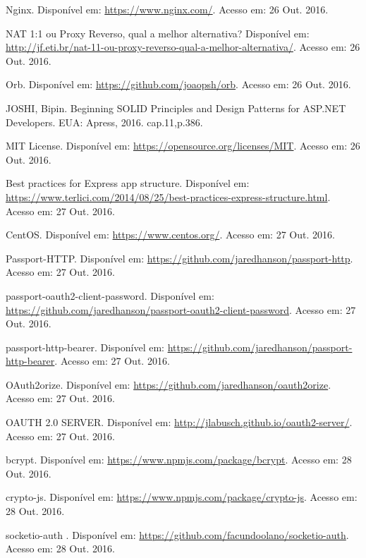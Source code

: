 \documentclass[brazil,ruledheader]{abntifes}
\begin{document}
\begin{thebibliography}{9}
		Nginx. Disponível em: \url{https://www.nginx.com/}.
		Acesso em: 26 Out. 2016.
		
		NAT 1:1 ou Proxy Reverso, qual a melhor alternativa? Disponível em: \url{http://jf.eti.br/nat-11-ou-proxy-reverso-qual-a-melhor-alternativa/}.
		Acesso em: 26 Out. 2016.
		
		Orb. Disponível em: \url{https://github.com/joaopsh/orb}.
		Acesso em: 26 Out. 2016.
		
		JOSHI, Bipin. Beginning SOLID Principles and Design Patterns for ASP.NET Developers. EUA: Apress,
		2016. cap.11,p.386.
		
		MIT License. Disponível em: \url{https://opensource.org/licenses/MIT}.
		Acesso em: 26 Out. 2016.
		
		Best practices for Express app structure. Disponível em: \url{https://www.terlici.com/2014/08/25/best-practices-express-structure.html}.
		Acesso em: 27 Out. 2016.
		
		CentOS. Disponível em: \url{https://www.centos.org/}.
		Acesso em: 27 Out. 2016.
		
		Passport-HTTP. Disponível em: \url{https://github.com/jaredhanson/passport-http}.
		Acesso em: 27 Out. 2016.
		
		passport-oauth2-client-password. Disponível em: \url{https://github.com/jaredhanson/passport-oauth2-client-password}.
		Acesso em: 27 Out. 2016.
		
		passport-http-bearer. Disponível em: \url{https://github.com/jaredhanson/passport-http-bearer}.
		Acesso em: 27 Out. 2016.
		
		OAuth2orize. Disponível em: \url{https://github.com/jaredhanson/oauth2orize}.
		Acesso em: 27 Out. 2016.
		
		OAUTH 2.0 SERVER. Disponível em: \url{http://jlabusch.github.io/oauth2-server/}.
		Acesso em: 27 Out. 2016.
		
		bcrypt. Disponível em: \url{https://www.npmjs.com/package/bcrypt}.
		Acesso em: 28 Out. 2016.
		
		crypto-js. Disponível em: \url{https://www.npmjs.com/package/crypto-js}.
		Acesso em: 28 Out. 2016.
		
		socketio-auth . Disponível em: \url{https://github.com/facundoolano/socketio-auth}.
		Acesso em: 28 Out. 2016.
	\end{thebibliography}
		\anexo
		
	
\end{document}
